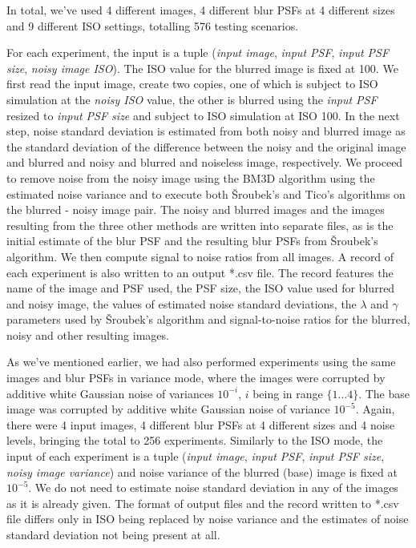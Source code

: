 \documentclass[12pt,notitlepage]{report}
\begin{document}
In total, we've used 4 different images, 4 different blur PSFs at 4 different sizes and 9 different ISO settings, totalling 576 testing scenarios. 

For each experiment, the input is a tuple ({\em input image}, {\em input PSF}, {\em input PSF size}, {\em noisy image ISO}). The ISO value for the blurred image is fixed at 100. We first read the input image, create two copies, one of which is subject to ISO simulation at the {\em noisy ISO} value, the other is blurred using the {\em input PSF} resized to {\em input PSF size} and subject to ISO simulation at ISO 100. In the next step, noise standard deviation is estimated from both noisy and blurred image as the standard deviation of the difference between the noisy and the original image and blurred and noisy and blurred and noiseless image, respectively. We proceed to remove noise from the noisy image using the BM3D algorithm using the estimated noise variance and to execute both Šroubek's and Tico's algorithms on the blurred - noisy image pair. The noisy and blurred images and the images resulting from the three other methods are written into separate files, as is the initial estimate of the blur PSF and the resulting blur PSFs from Šroubek's algorithm. We then compute signal to noise ratios from all images. A record of each experiment is also written to an output *.csv file. The record features the name of the image and PSF used, the PSF size, the ISO value used for blurred and noisy image, the values of estimated noise standard deviations, the $\lambda$ and $\gamma$ parameters used by Šroubek's algorithm and signal-to-noise ratios for the blurred, noisy and other resulting images.  

As we've mentioned earlier, we had also performed experiments using the same images and blur PSFs in variance mode, where the images were corrupted by additive white Gaussian noise of variances $10^{-i}$, $i$ being in range $\lbrace 1 \dots 4 \rbrace$. The base image was corrupted by additive white Gaussian noise of variance $10^{-5}$. Again, there were 4 input images, 4 different blur PSFs at 4 different sizes and 4 noise levels, bringing the total to 256 experiments. Similarly to the ISO mode, the input of each experiment is a tuple ({\em input image}, {\em input PSF}, {\em input PSF size}, {\em noisy image variance}) and noise variance of the blurred (base) image is fixed at $10^{-5}$. We do not need to estimate noise standard deviation in any of the images as it is already given. The format of output files and the record written to *.csv file differs only in ISO being replaced by noise variance and the estimates of noise standard deviation not being present at all. 
\end{document}
